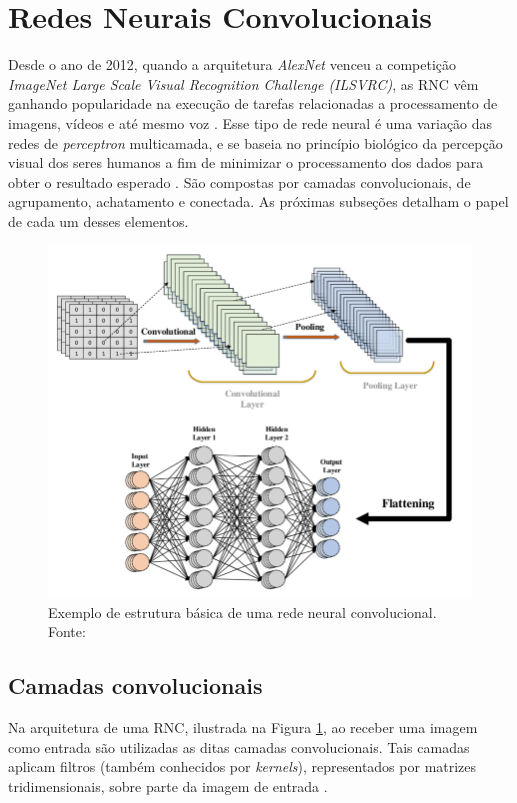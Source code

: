 
\section{Redes Neurais Convolucionais}

Desde o ano de 2012, quando a arquitetura \textit{AlexNet} venceu a competição \textit{ImageNet Large Scale Visual Recognition Challenge (ILSVRC)}, as \acf{RNC} vêm ganhando popularidade na execução de tarefas relacionadas a processamento de imagens, vídeos e até mesmo voz \cite{vargas2016estudo}.
Esse tipo de rede neural é uma variação das redes de \textit{perceptron} multicamada, e se baseia no princípio biológico da percepção visual dos seres humanos a fim de minimizar o processamento dos dados para obter o resultado esperado \cite{mueller2019deep}. São compostas por camadas convolucionais, de agrupamento, achatamento e conectada. As próximas subseções detalham o papel de cada um desses elementos.

\begin{figure}[H]
  \centering
  \includegraphics[width=.45\linewidth]{figures/2_theoric_foundamentations/cnn.png}
  \caption[Estrutura básica de uma rede neural convolucional.]{Exemplo de estrutura básica de uma rede neural convolucional. Fonte: \cite{srinivasan2021durld}}
  \label{fig:cnn}
\end{figure}

\subsection{Camadas convolucionais}

Na arquitetura de uma \ac{RNC}, ilustrada na Figura \ref{fig:cnn}, ao receber uma imagem como entrada são utilizadas as ditas camadas convolucionais. Tais camadas aplicam filtros (também conhecidos por \textit{kernels}), representados por matrizes tridimensionais, sobre parte da imagem de entrada \cite{rawat2017deep}.

